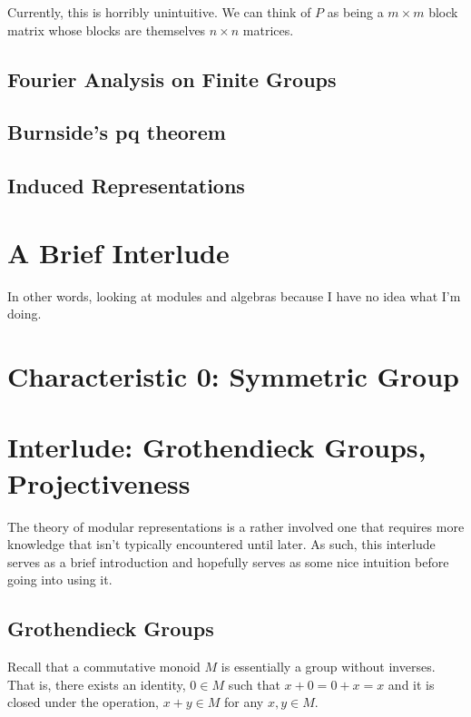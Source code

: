 \documentclass{article}
\begin{document}
\begin{note}

Currently, this is horribly unintuitive. We can think of $P$ as being a $m \times m$ block matrix whose blocks are themselves $n \times n$ matrices.
\end{note}





\subsection{Fourier Analysis on Finite Groups}

\subsection{Burnside's pq theorem}

\subsection{Induced Representations}

\section{A Brief Interlude}
In other words, looking at modules and algebras because I have no idea what I'm doing.

\section{Characteristic 0: Symmetric Group}


\section{Interlude: Grothendieck Groups, Projectiveness}
The theory of modular representations is a rather involved one that requires more knowledge that isn't typically encountered until later. As such, this interlude serves as a brief introduction and hopefully serves as some nice intuition before going into using it.

\subsection{Grothendieck Groups}

Recall that a commutative monoid $M$ is essentially a group without inverses. That is, there exists an identity, $0 \in M$ such that $x+0=0+x=x$ and it is closed under the operation, $x+y \in M$ for any $x,y \in M$.
\end{document}
